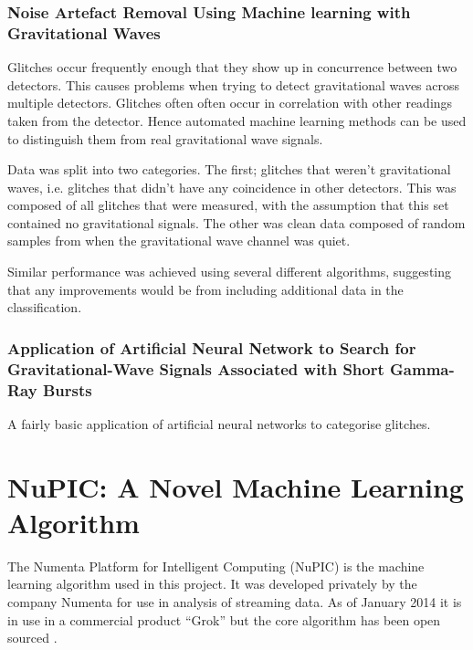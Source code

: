 \documentclass[a4paper]{jpconf}
\begin{document}
		\subsubsection*{Noise Artefact Removal Using Machine learning with Gravitational Waves \cite{biswas_application_2013}}
			Glitches occur frequently enough that they show up in concurrence between two detectors. This causes problems when trying to detect gravitational waves across multiple detectors. Glitches often often occur in correlation with other readings taken from the detector. Hence automated machine learning methods can be used to distinguish them from real gravitational wave signals.

			Data was split into two categories. The first; glitches that weren't gravitational waves, i.e. glitches that didn't have any coincidence in other detectors. This was composed of all glitches that were measured, with the assumption that this set contained no gravitational signals. The other was clean data composed of random samples from when the gravitational wave channel was quiet.

			Similar performance was achieved using several different algorithms, suggesting that any improvements would be from including additional data in the classification.

		\subsubsection*{Application of Artificial Neural Network to Search for Gravitational-Wave Signals Associated with Short Gamma-Ray Bursts \cite{kim_application_2014}}
			A fairly basic application of artificial neural networks to categorise glitches.
		
\section{NuPIC: A Novel Machine Learning Algorithm}
	The Numenta Platform for Intelligent Computing (NuPIC) is the machine learning algorithm used in this project. It was developed privately by the company Numenta for use in analysis of streaming data. As of January 2014 it is in use in a commercial product ``Grok'' but the core algorithm has been open sourced \cite{nupicGitHub}.
		
\end{document}
